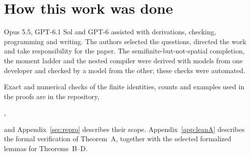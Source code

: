 \section*{How this work was done}\label{sec:methods}
Opus 5.5, GPT-6.1 Sol and GPT-6 assisted with derivations, checking, programming and writing. The authors selected the questions, directed the work and take responsibility for the paper. The semifinite-but-not-spatial completion, the moment ladder and the nested compiler were derived with models from one developer and checked by a model from the other; these checks were automated.

Exact and numerical checks of the finite identities, counts and examples used in the proofs are in the repository,
\begin{center}\codearchive,\end{center}
and Appendix~\ref{sec:repro} describes their scope. Appendix~\ref{app:leanA} describes the formal verification of Theorem~A, together with the selected formalized lemmas for Theorems~B--D.
